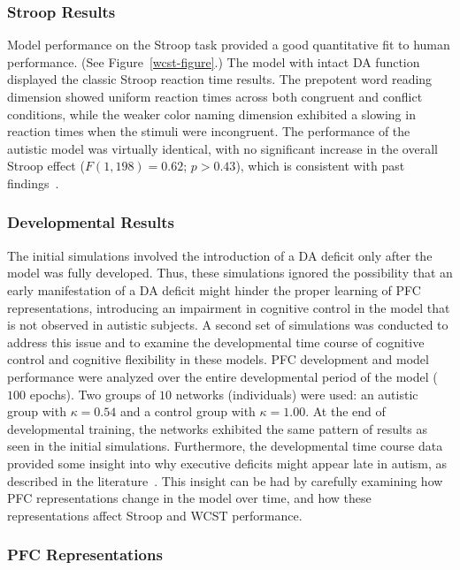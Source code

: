 \subsubsection{Stroop Results} 

Model performance on the Stroop task provided a good quantitative fit to human performance.  (See Figure~\ref{wcst-figure}.) The model with intact DA function displayed the classic Stroop reaction time results.  The prepotent word reading dimension showed uniform reaction times across both congruent and conflict conditions, while the weaker color naming dimension exhibited a slowing in reaction times when the stimuli were incongruent.  The performance of the autistic model was virtually identical, with no significant increase in the overall Stroop effect ($F(1,198) = 0.62$; $p > 0.43$), which is consistent with past findings~\cite{Ozonoff:1999:AutismStroopWCST}.


\subsubsection{Developmental Results}

The initial simulations involved the introduction of a DA deficit only
after the model was fully developed.  Thus, these simulations ignored
the possibility that an early manifestation of a DA deficit might
hinder the proper learning of PFC representations, introducing an
impairment in cognitive control in the model that is not observed in
autistic subjects.  A second set of simulations was conducted to
address this issue and to examine the developmental time course of
cognitive control and cognitive flexibility in these models.  PFC
development and model performance were analyzed over the entire
developmental period of the model ($100$ epochs).  Two groups of $10$
networks (individuals) were used: an autistic group with $\kappa = 0.54$
and a control group with $\kappa = 1.00$.  At the end of developmental
training, the networks exhibited the same pattern of results as seen
in the initial simulations.  Furthermore, the developmental time
course data provided some insight into why executive deficits might
appear late in autism, as described in the
literature~\cite{GriffithEM:1999:AutismYoungED}.  This insight can be had by carefully examining how PFC representations change in the model over time, and how these representations affect Stroop and WCST performance.

\subsubsection{PFC Representations} 

